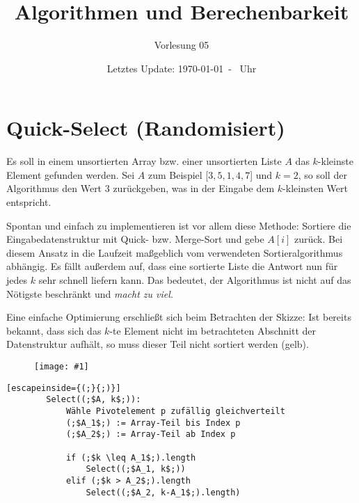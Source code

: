 \documentclass{scrartcl}%
\newcommand{\includepic}[2]{\texttt{[image: \#1]}}
\begin{document}
    \subject{Vorlesungsmitschrieb}
    \title{Algorithmen und Berechenbarkeit}
    \subtitle{Vorlesung 05}
    \date{Letztes Update: \today \ - \currenttime \ Uhr}
    \maketitle

    \section*{Quick-Select (Randomisiert)}\label{sec:quick-select}
    Es soll in einem unsortierten Array bzw. einer unsortierten Liste $A$ das $k$-kleinste Element gefunden werden.
    Sei $A$ zum Beispiel [$3,5,1,4,7$] und $k=2$, so soll der Algorithmus den Wert $3$ zurückgeben, was in der Eingabe dem $k$-kleinsten Wert entspricht.

    Spontan und einfach zu implementieren ist vor allem diese Methode: Sortiere die Eingabedatenstruktur mit Quick- bzw.
    Merge-Sort und gebe $A[i]$ zurück.
    Bei diesem Ansatz in die Laufzeit maßgeblich vom verwendeten Sortieralgorithmus abhängig.
    Es fällt außerdem auf, dass eine sortierte Liste die Antwort nun für jedes $k$ sehr schnell liefern kann.
    Das bedeutet, der Algorithmus ist nicht auf das Nötigste beschränkt und \textit{macht zu viel}.

    Eine einfache Optimierung erschließt sich beim Betrachten der Skizze: Ist bereits bekannt, dass sich das $k$-te Element nicht im betrachteten Abschnitt der Datenstruktur aufhält, so muss dieser Teil nicht sortiert werden (gelb).
    \begin{figure}[htb]
        \centering
        \includepic{lec_05_a}{0.4}
    \end{figure}

    \begin{lstlisting}[escapeinside={(;}{;)}]
        Select((;$A, k$;)):
            Wähle Pivotelement p zufällig gleichverteilt
            (;$A_1$;) := Array-Teil bis Index p
            (;$A_2$;) := Array-Teil ab Index p

            if (;$k \leq A_1$;).length
                Select((;$A_1, k$;))
            elif (;$k > A_2$;).length
                Select((;$A_2, k-A_1$;).length)
    \end{lstlisting}
\end{document}
